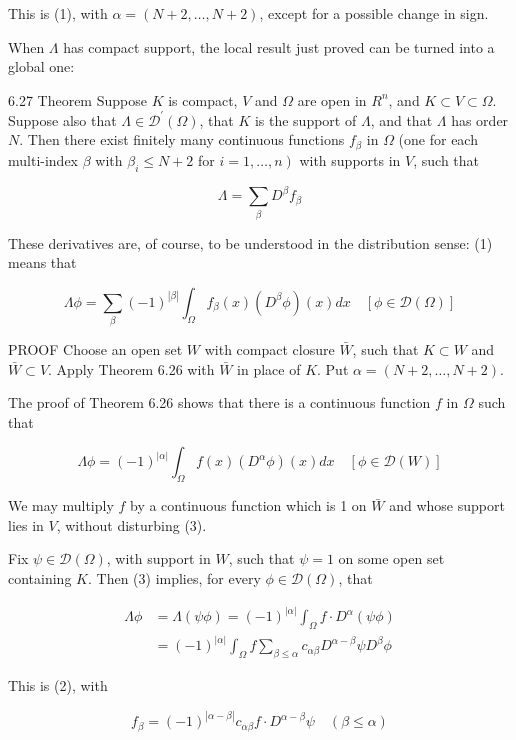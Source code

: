 \documentclass[10pt]{article}
\begin{document}
This is (1), with $\alpha=(N+2, \ldots, N+2)$, except for a possible change in sign.

When $\Lambda$ has compact support, the local result just proved can be turned into a global one:

6.27 Theorem Suppose $K$ is compact, $V$ and $\Omega$ are open in $R^{n}$, and $K \subset V \subset \Omega$. Suppose also that $\Lambda \in \mathscr{D}^{\prime}(\Omega)$, that $K$ is the support of $\Lambda$, and that $\Lambda$ has order $N$. Then there exist finitely many continuous functions $f_{\beta}$ in $\Omega$ (one for each multi-index $\beta$ with $\beta_{i} \leq N+2$ for $\left.i=1, \ldots, n\right)$ with supports in $V$, such that

$$
\Lambda=\sum_{\beta} D^{\beta} f_{\beta}
$$

These derivatives are, of course, to be understood in the distribution sense: (1) means that

$$
\Lambda \phi=\sum_{\beta}(-1)^{|\beta|} \int_{\Omega} f_{\beta}(x)\left(D^{\beta} \phi\right)(x) d x \quad[\phi \in \mathscr{D}(\Omega)]
$$

PROOF Choose an open set $W$ with compact closure $\bar{W}$, such that $K \subset W$ and $\bar{W} \subset V$. Apply Theorem 6.26 with $\bar{W}$ in place of $K$. Put $\alpha=(N+2, \ldots, N+2)$.

The proof of Theorem 6.26 shows that there is a continuous function $f$ in $\Omega$ such that

$$
\Lambda \phi=(-1)^{|\alpha|} \int_{\Omega} f(x)\left(D^{\alpha} \phi\right)(x) d x \quad[\phi \in \mathscr{D}(W)]
$$

We may multiply $f$ by a continuous function which is 1 on $\bar{W}$ and whose support lies in $V$, without disturbing (3).

Fix $\psi \in \mathscr{D}(\Omega)$, with support in $W$, such that $\psi=1$ on some open set containing $K$. Then (3) implies, for every $\phi \in \mathscr{D}(\Omega)$, that

$$
\begin{aligned}
\Lambda \phi & =\Lambda(\psi \phi)=(-1)^{|\alpha|} \int_{\Omega} f \cdot D^{\alpha}(\psi \phi) \\
& =(-1)^{|\alpha|} \int_{\Omega} f \sum_{\beta \leq \alpha} c_{\alpha \beta} D^{\alpha-\beta} \psi D^{\beta} \phi
\end{aligned}
$$

This is (2), with

$$
f_{\beta}=(-1)^{|\alpha-\beta|} c_{\alpha \beta} f \cdot D^{\alpha-\beta} \psi \quad(\beta \leq \alpha)
$$
\end{document}
